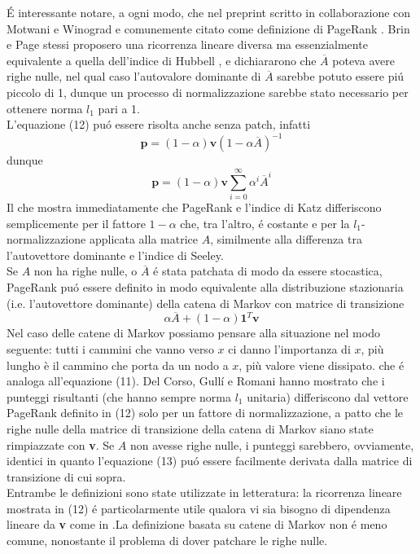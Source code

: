 É interessante notare, a ogni modo, che nel preprint scritto in collaborazione con Motwani e Winograd e comunemente citato come definizione di PageRank %
. Brin e Page stessi proposero una ricorrenza lineare diversa ma essenzialmente equivalente a quella dell'indice di Hubbell %
, e dichiararono che $\overline{A}$ poteva avere righe nulle, nel qual caso l'autovalore dominante di $\overline{A}$ sarebbe potuto essere piú piccolo di 1, dunque un processo di normalizzazione sarebbe stato necessario per ottenere norma $l_1$ pari a 1.\\
L'equazione (12) puó essere risolta anche senza patch, infatti
\begin{equation}
    \textbf{p} = (1 - \alpha)\textbf{v}(1 - \alpha\overline{A})^{-1}
\end{equation}
dunque
\begin{equation*}
    \textbf{p} = (1 - \alpha)\textbf{v}\sum_{i = 0}^{\infty}{\alpha^i\overline{A}^i}
\end{equation*}
Il che mostra immediatamente che PageRank e l'indice di Katz differiscono semplicemente per il fattore $1 - \alpha$ che, tra l'altro, é costante e per la $l_1$-normalizzazione applicata alla matrice $A$, similmente alla differenza tra l'autovettore dominante e l'indice di Seeley.\\
Se $A$ non ha righe nulle, o $\overline{A}$ é stata patchata di modo da essere stocastica, PageRank puó essere definito in modo equivalente alla distribuzione stazionaria (i.e. l'autovettore dominante) della catena di Markov con matrice di transizione
\begin{equation*}
    \alpha\overline{A} + (1 - \alpha)\textbf{1}^T\textbf{v}
\end{equation*}
Nel caso delle catene di Markov possiamo pensare alla situazione nel modo seguente: tutti i cammini che vanno verso $x$ ci danno l'importanza di $x$, più lungho è il cammino che porta da un nodo a $x$, più valore viene dissipato.
che é analoga all'equazione (11). Del Corso, Gullí e Romani %
hanno mostrato che i punteggi risultanti (che hanno sempre norma $l_1$ unitaria) differiscono dal vettore PageRank definito in (12) solo per un fattore di normalizzazione, a patto che le righe nulle della matrice di transizione della catena di Markov siano state rimpiazzate con \textbf{v}. Se $A$ non avesse righe nulle, i punteggi sarebbero, ovviamente, identici in quanto l'equazione (13) puó essere facilmente derivata dalla matrice di transizione di cui sopra.\\
Entrambe le definizioni sono state utilizzate in letteratura: la ricorrenza lineare mostrata in (12) é particolarmente utile qualora vi sia bisogno di dipendenza lineare da \textbf{v} come in %
.La definizione basata su catene di Markov non é meno comune, nonostante il problema di dover patchare le righe nulle.